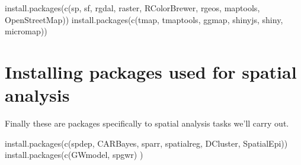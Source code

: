 \documentclass[
]{book}
\newenvironment{Shaded}{\begin{snugshade}}{\end{snugshade}}
\newcommand{\FunctionTok}[1]{\textcolor[rgb]{0.00,0.00,0.00}{#1}}
\newcommand{\NormalTok}[1]{#1}
\newcommand{\StringTok}[1]{\textcolor[rgb]{0.31,0.60,0.02}{#1}}
\begin{document}
\begin{Shaded}
\begin{Highlighting}[]
\FunctionTok{install.packages}\NormalTok{(}\FunctionTok{c}\NormalTok{(}\StringTok{\textquotesingle{}sp\textquotesingle{}}\NormalTok{, }\StringTok{\textquotesingle{}sf\textquotesingle{}}\NormalTok{, }\StringTok{\textquotesingle{}rgdal\textquotesingle{}}\NormalTok{, }\StringTok{\textquotesingle{}raster\textquotesingle{}}\NormalTok{, }\StringTok{\textquotesingle{}RColorBrewer\textquotesingle{}}\NormalTok{, }\StringTok{\textquotesingle{}rgeos\textquotesingle{}}\NormalTok{, }\StringTok{\textquotesingle{}maptools\textquotesingle{}}\NormalTok{, }\StringTok{\textquotesingle{}OpenStreetMap\textquotesingle{}}\NormalTok{))  }
\FunctionTok{install.packages}\NormalTok{(}\FunctionTok{c}\NormalTok{(}\StringTok{\textquotesingle{}tmap\textquotesingle{}}\NormalTok{, }\StringTok{\textquotesingle{}tmaptools\textquotesingle{}}\NormalTok{, }\StringTok{\textquotesingle{}ggmap\textquotesingle{}}\NormalTok{, }\StringTok{\textquotesingle{}shinyjs\textquotesingle{}}\NormalTok{, }\StringTok{\textquotesingle{}shiny\textquotesingle{}}\NormalTok{, }\StringTok{\textquotesingle{}micromap\textquotesingle{}}\NormalTok{)) }
\end{Highlighting}
\end{Shaded}

\hypertarget{installing-packages-used-for-spatial-analysis}{%
\section*{Installing packages used for spatial analysis}\label{installing-packages-used-for-spatial-analysis}}

Finally these are packages specifically to spatial analysis tasks we'll carry out.

\begin{Shaded}
\begin{Highlighting}[]
\FunctionTok{install.packages}\NormalTok{(}\FunctionTok{c}\NormalTok{(}\StringTok{\textquotesingle{}spdep\textquotesingle{}}\NormalTok{, }\StringTok{\textquotesingle{}CARBayes\textquotesingle{}}\NormalTok{, }\StringTok{\textquotesingle{}sparr\textquotesingle{}}\NormalTok{, }\StringTok{\textquotesingle{}spatialreg\textquotesingle{}}\NormalTok{,  }\StringTok{\textquotesingle{}DCluster\textquotesingle{}}\NormalTok{, }\StringTok{\textquotesingle{}SpatialEpi\textquotesingle{}}\NormalTok{))}
\FunctionTok{install.packages}\NormalTok{(}\FunctionTok{c}\NormalTok{(}\StringTok{\textquotesingle{}GWmodel\textquotesingle{}}\NormalTok{, }\StringTok{\textquotesingle{}spgwr\textquotesingle{}}\NormalTok{) )}
\end{Highlighting}
\end{Shaded}
\end{document}
